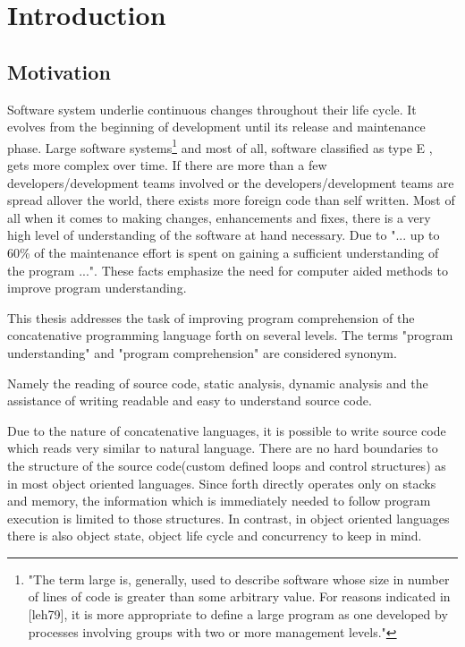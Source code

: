 \chapter{Introduction}

\section*{Motivation}

Software system underlie continuous changes throughout their life cycle.
It evolves from the beginning of development until its release and maintenance phase. Large software systems\footnote{"The term large is, generally, used to describe software whose size in number of lines of code is greater than some arbitrary value. For reasons indicated in [leh79], it is more appropriate to define a large program as one developed by processes involving groups with two or more management levels."\cite{Lehman:2003:SEB:950401.950407}} and most of all, software  classified as type E \cite{Cook:2006:ESS:1115566.1115567}, gets more complex over time. If there are more than a few developers/development teams involved or the developers/development teams are spread allover the world, there exists more foreign code than self written.
Most of all when it comes to making changes, enhancements and fixes, there is a very high level of understanding of the software at hand necessary\cite{Boehm:1976:SE:1311958.1312684}\cite{Singer97anexamination}. Due to \cite{Cornelissen:2009:SSP:1638616.1639301} "... up to 60\% of the maintenance effort is spent on gaining a sufficient understanding of the program ...". These facts emphasize the need for computer aided methods to improve program understanding.

This thesis addresses the task of improving program comprehension of the concatenative programming language forth on several levels. The terms "program understanding" and "program comprehension" are considered synonym. 

Namely the reading of source code, static analysis, dynamic analysis and the assistance of writing readable and easy to understand source code.

Due to the nature of concatenative languages, it is possible to write source code which reads very similar to natural language. There are no hard boundaries to the structure of the source code(custom defined loops and control structures) as in most object oriented languages. Since forth directly operates only on stacks and memory, the information which is immediately needed to follow program execution is limited to those structures. In contrast, in object oriented languages there is also object state, object life cycle and concurrency to keep in mind.

